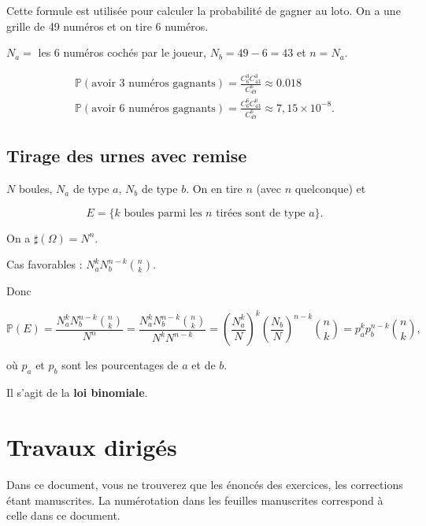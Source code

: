 \documentclass[french]{book}
\theoremstyle{definition}
\theoremstyle{remark}
\begin{document}
Cette formule est utilisée pour calculer la probabilité de gagner au loto. On a une grille de 49 numéros et on tire 6 numéros.

$N_a =$ les 6 numéros cochés par le joueur, $N_b = 49-6 = 43$ et $n=N_a$.

\begin{gather*}
  \mathbb{P}( \text{avoir 3 numéros gagnants} ) = \frac{C^{3}_{6} C^{3}_{43}}{C^{6}_{49}} \approx 0.018 \\
  \mathbb{P}( \text{avoir 6 numéros gagnants} ) = \frac{C^{6}_{6} C^{0}_{43}}{C_{49}^{6}} \approx 7,15 \times 10 ^{-8}.
\end{gather*}

\section{Tirage des urnes avec remise}

$N$ boules, $N_a$ de type $a$, $N_b$ de type $b$. On en tire $n$ (avec $n$ quelconque) et

\begin{equation*}
  E = \{ k \text{ boules parmi les } n \text{ tirées sont de type } a  \}.
\end{equation*}

On a $\sharp(\Omega) = N ^{n}$.

Cas favorables : $N_a ^{k} N_b ^{n-k} \binom{n}{k}$.

Donc

\begin{equation*}
  \mathbb{P}( E ) = \frac{N_a ^{k} N_b ^{n-k} \binom{n}{k}}{N ^{n}} = \frac{N_a ^{k} N_b ^{n-k} \binom{n}{k}}{N ^{k} N ^{n-k}} = \left( \frac{N_a ^{k}}{N}\right) ^{k} \left( \frac{N_b}{N}\right) ^{n-k} \binom{n}{k} = p_a ^{k} p_b ^{n-k} \binom{n}{k},
\end{equation*}

où $p_a$ et $p_b$ sont les pourcentages de $a$ et de $b$.

Il s'agit de la \textbf{loi binomiale}.


\chapter*{Travaux dirigés}

Dans ce document, vous ne trouverez que les énoncés des exercices, les corrections étant manuscrites. La numérotation dans les feuilles manuscrites correspond à celle dans ce document.
\end{document}
